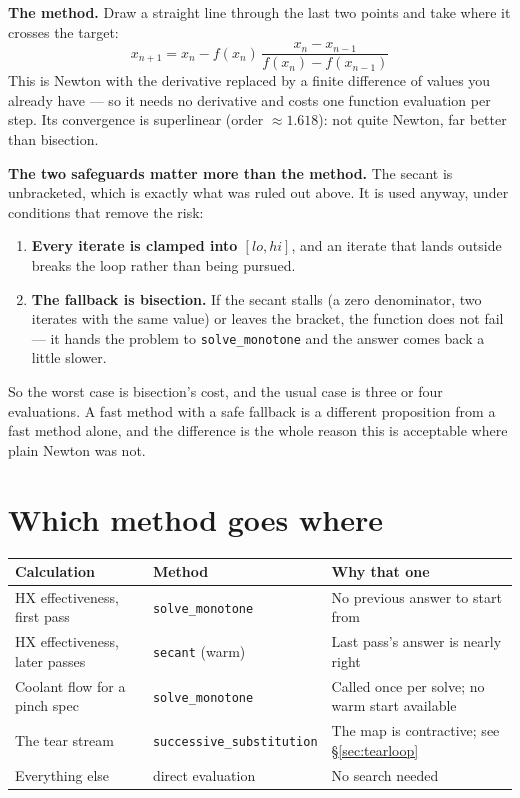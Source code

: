 \documentclass[11pt,a4paper]{report}
\newcommand{\code}[1]{\texttt{\small #1}}
\begin{document}
\textbf{The method.} Draw a straight line through the last two points and
take where it crosses the target:
\[
x_{n+1} = x_n - f(x_n)\,\frac{x_n - x_{n-1}}{f(x_n) - f(x_{n-1})}
\]
This is Newton with the derivative replaced by a finite difference of
values you already have --- so it needs no derivative and costs one
function evaluation per step. Its convergence is superlinear (order
$\approx 1.618$): not quite Newton, far better than bisection.


\textbf{The two safeguards matter more than the method.} The secant is
unbracketed, which is exactly what was ruled out above. It is used anyway,
under conditions that remove the risk:

\begin{enumerate}\itemsep2pt
\item \textbf{Every iterate is clamped into $[lo, hi]$}, and an iterate
      that lands outside breaks the loop rather than being pursued.
\item \textbf{The fallback is bisection.} If the secant stalls (a zero
      denominator, two iterates with the same value) or leaves the
      bracket, the function does not fail --- it hands the problem to
      \code{solve\_monotone} and the answer comes back a little slower.
\end{enumerate}

So the worst case is bisection's cost, and the usual case is three or four
evaluations. A fast method with a safe fallback is a different proposition
from a fast method alone, and the difference is the whole reason this is
acceptable where plain Newton was not.

\section{Which method goes where}

\begin{center}
\small
\begin{tabular}{@{}p{4.6cm}p{3.4cm}p{5.2cm}@{}}
\toprule
Calculation & Method & Why that one \\
\midrule
HX effectiveness, first pass &
\code{solve\_monotone} &
No previous answer to start from \\[2pt]
HX effectiveness, later passes &
\code{secant} (warm) &
Last pass's answer is nearly right \\[2pt]
Coolant flow for a pinch spec &
\code{solve\_monotone} &
Called once per solve; no warm start available \\[2pt]
The tear stream &
\code{successive\_substitution} &
The map is contractive; see \S\ref{sec:tearloop} \\[2pt]
Everything else &
direct evaluation &
No search needed \\
\bottomrule
\end{tabular}
\end{center}
\end{document}
